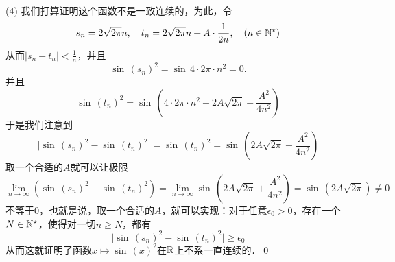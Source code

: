 (4) \prove 我们打算证明这个函数不是一致连续的，为此，令
\begin{equation}
    s_n = 2 \sqrt{2 \pi} n , \quad t_n = 2 \sqrt{2 \pi} n + A \cdot \frac{1}{2n}, \quad \left(n \in \mathbb{N}^\star \right)
\end{equation}
从而$\lvert s_n - t_n \rvert < \displaystyle\frac{1}{n}$，并且
\begin{equation}
    \sin \, \left( s_n \right)^2 = \sin \, 4 \cdot 2 \pi \cdot n^2 =  0.
\end{equation}
并且
\begin{equation}
    \sin \, \left( t_n \right)^2 = \sin \, \left(4 \cdot 2 \pi \cdot n^2 + 2A\sqrt{2\pi} + \frac{A^2}{4n^2} \right)
\end{equation}
于是我们注意到
\begin{equation}
    \lvert \sin \, \left(s_n\right)^2 - \sin \, \left(t_n\right)^2 \rvert = \sin \, \left(t_n\right)^2 = \sin \, \left(2 A \sqrt{2 \pi} + \frac{A^2}{4n^2}\right)
\end{equation}
取一个合适的$A$就可以让极限
\begin{equation}
    \lim_{n \to \infty} \left( \sin \, \left(s_n\right)^2 - \sin \, \left(t_n\right)^2\right) = \lim_{n \to \infty} \sin \, \left(2A\sqrt{2\pi} + \frac{A^2}{4n^2}\right) = \sin \, \left( 2A\sqrt{2\pi} \right) \neq 0
\end{equation}
不等于$0$，也就是说，取一个合适的$A$，就可以实现：对于任意$\epsilon_0 > 0$，存在一个$N \in \mathbb{N}^\star$，使得对一切$n \geq N$，都有
\begin{equation}
    \lvert \sin \, \left(s_n\right)^2 - \sin \, \left( t_n \right)^2 \rvert \geq \epsilon_0
\end{equation}
从而这就证明了函数$x \mapsto \sin \, \left(x\right)^2$在$\mathbb{R}$上不系一直连续的．\qed\bigskip

